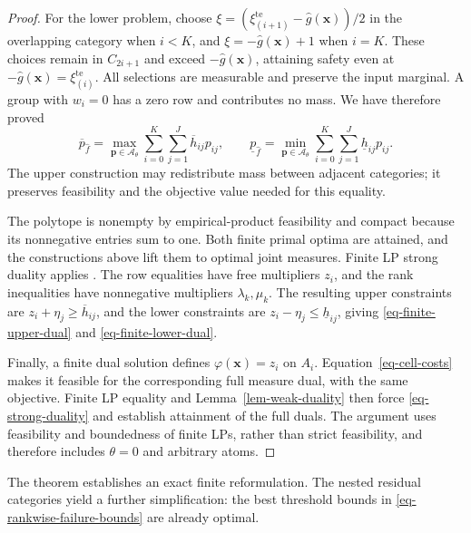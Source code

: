 \documentclass[review,11pt,3p,authoryear,nopreprintline]{elsarticle}
\begin{document}
\begin{proof}
  For the lower problem, choose
  $\xi=\left(\xi_{(i+1)}^{\mathrm{te}}-\hat g(\bm x)\right)/2$ in the overlapping category when $i<K$, and $\xi=-\hat g(\bm x)+1$ when $i=K$. These choices remain in $C_{2i+1}$ and exceed $-\hat g(\bm x)$, attaining safety even at $-\hat g(\bm x)=\xi_{(i)}^{\mathrm{te}}$. All selections are measurable and preserve the input marginal. A group with $w_i=0$ has a zero row and contributes no mass. We have therefore proved
  \begin{equation}
    \overline p_{\hat f}
    =\max_{\bm p\in\mathcal A_\theta}\sum_{i=0}^K\sum_{j=1}^J
      \overline h_{ij}p_{ij},\qquad
    \underline p_{\hat f}
    =\min_{\bm p\in\mathcal A_\theta}\sum_{i=0}^K\sum_{j=1}^J
      \underline h_{ij}p_{ij}.
    \label{eq-finite-primal-values}
  \end{equation}
  The upper construction may redistribute mass between adjacent categories; it preserves feasibility and the objective value needed for this equality.

  The polytope is nonempty by empirical-product feasibility and compact because its nonnegative entries sum to one. Both finite primal optima are attained, and the constructions above lift them to optimal joint measures. Finite LP strong duality applies \citep[Section~5.2.3]{B.V04}. The row equalities have free multipliers $z_i$, and the rank inequalities have nonnegative multipliers $\lambda_k,\mu_k$. The resulting upper constraints are $z_i+\eta_j\ge\overline h_{ij}$, and the lower constraints are $z_i-\eta_j\le\underline h_{ij}$, giving \eqref{eq-finite-upper-dual} and \eqref{eq-finite-lower-dual}.

  Finally, a finite dual solution defines $\varphi(\bm x)=z_i$ on $A_i$. Equation~\eqref{eq-cell-costs} makes it feasible for the corresponding full measure dual, with the same objective. Finite LP equality and Lemma~\ref{lem-weak-duality} then force \eqref{eq-strong-duality} and establish attainment of the full duals. The argument uses feasibility and boundedness of finite LPs, rather than strict feasibility, and therefore includes $\theta=0$ and arbitrary atoms.
\end{proof}

The theorem establishes an exact finite reformulation. The nested residual categories yield a further simplification: the best threshold bounds in \eqref{eq-rankwise-failure-bounds} are already optimal.
\end{document}
